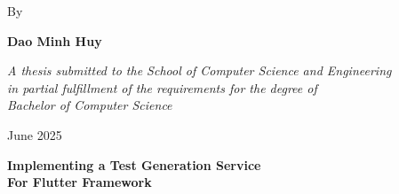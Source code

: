 \documentclass[12pt, oneside]{report}
\begin{document}
\begin{titlepage}
	\vspace{1.5cm}
	By \par \textbf{Dao Minh Huy}
														
	\vspace{4.5cm}
	\textit{A thesis submitted to the School of Computer Science and Engineering \\ 
    in partial fulfillment of the requirements for the degree of \\ Bachelor of Computer Science}
														
	\vspace{3.5cm}
	 \par June 2025
														
	\newpage
													
	\centering
														
	\textbf{\large Implementing a Test Generation Service \\ For Flutter Framework}\par
	\vspace{4cm}
														
	\hspace{7cm}
	\par
	\vspace{2cm}
														
	\hspace{7cm}
	\makebox[7cm][l]{\underline{\hspace{7cm}}}
	\par \hspace{7cm}
	\par
	\vspace{2cm}
														
	\hspace{7cm}
	\makebox[7cm][l]{\underline{\hspace{7cm}}}
	\par \hspace{7cm}
	\par
	\vspace{2cm}
														
	\hspace{7cm}
	\makebox[7cm][l]{\underline{\hspace{7cm}}}
	\par \hspace{7cm}
	\par
	\vspace{0.75cm}
														
	\hspace{7cm}
	\par
	\thispagestyle{empty}
\end{titlepage}
\restoregeometry
	
\end{document}
